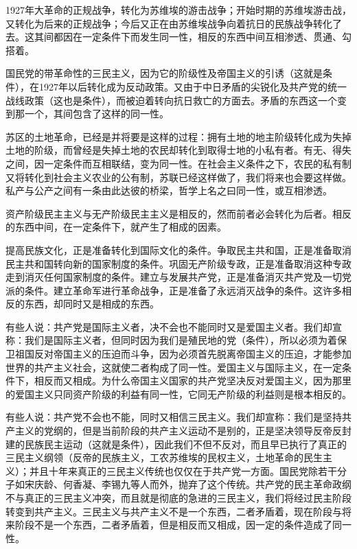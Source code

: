 \documentclass[UTF8, 12pt, a4paper]{ctexrep}
\begin{document}
1927年大革命的正规战争，转化为苏维埃的游击战争；开始时期的苏维埃游击战，又转化为后来的正规战争；今后又正在由苏维埃战争向着抗日的民族战争转化了去。这其间都因在一定条件下而发生同一性，相反的东西中间互相渗透、贯通、勾搭着。

国民党的带革命性的三民主义，因为它的阶级性及帝国主义的引诱（这就是条件），在1927年以后转化成为反动政策。又由于中日矛盾的尖锐化及共产党的统一战线政策（这也是条件），而被迫着转向抗日救亡的方面去。矛盾的东西这一个变到那一个，其间包含了这样的同一性。

苏区的土地革命，已经是并将要是这样的过程：拥有土地的地主阶级转化成为失掉土地的阶级，而曾经是失掉土地的农民却转化到取得士地的小私有者。有无、得失之间，因一定条件而互相联结，变为同一性。在社会主义条件之下，农民的私有制又将转化到社会主义农业的公有制，苏联已经这样做了，我们将来也会要这样做。私产与公产之间有一条由此达彼的桥梁，哲学上名之曰同一性，或互相渗透。

资产阶级民主主义与无产阶级民主主义是相反的，然而前者必会转化为后者。相反的东西中间，在一定条件下，就产生了相成的因素。

提高民族文化，正是准备转化到国际文化的条件。争取民主共和国，正是准备取消民主共和国转向新的国家制度的条件。巩固无产阶级专政，正是准备取消这种专政走到消灭任何国家制度的条件。建立与发展共产党，正是准备消灭共产党及一切党派的条件。建立革命军进行革命战争，正是准备了永远消灭战争的条件。这许多相反的东西，却同时又是相成的东西。

有些人说：共产党是国际主义者，决不会也不能同时又是爱国主义者。我们却宣称：我们是国际主义者，但同时因为我们是殖民地的党（条件），所以必须为着保卫祖国反对帝国主义的压迫而斗争，因为必须首先脱离帝国主义的压迫，才能参加世界的共产主义社会，这就使二者构成了同一性。爱国主义与国际主义，在一定条件下，相反而又相成。为什么帝国主义国家的共产党坚决反对爱国主义，因为那里的爱国主义只同资产阶级的利益有同一性，它同无产阶级的利益则是根本相反的。

有些人说：共产党不会也不能，同时又相信三民主义。我们却宣称：我们是坚持共产主义的党纲的，但是当前阶段的共产主义运动不是别的，正是坚决领导反帝反封建的民族民主运动（这就是条件），因此我们不但不反对，而且早已执行了真正的三民主义纲领（反帝的民族主义，工农苏维埃的民权主义，土地革命的民生主义）；并且十年来真正的三民主义传统也仅仅在于共产党一方面。国民党除若干分子如宋庆龄、何香凝、李锡九等人而外，抛弃了这个传统。共产党的民主革命政纲不与真正的三民主义冲突，而且就是彻底的急进的三民主义，我们将经过民主阶段转变到共产主义。三民主义与共产主义不是一个东西，二者矛盾着，现在阶段与将来阶段不是一个东西，二者矛盾着，但是相反而又相成，因一定的条件造成了同一性。
\end{document}
